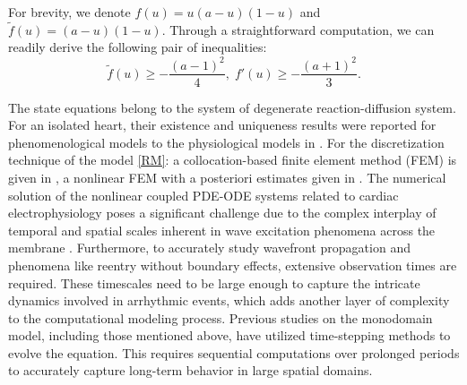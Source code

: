 \documentclass[11pt]{article}
\begin{document}
For brevity, we denote $f(u)= u(a-u)(1-u)$ and $\widetilde{f}(u)= (a-u)(1-u)$. Through a straightforward computation, we can readily derive the following pair of inequalities:
\begin{equation}\label{inequality1}
\widetilde{f}(u)\geq -\frac{(a-1)^2}{4},\;
f'(u)\geq -\frac{(a+1)^2}{3}.
\end{equation}

The state equations belong to the system of degenerate reaction-diffusion system.
For an isolated heart, their existence and uniqueness results were reported for phenomenological models
to the physiological models in \cite{Bourgault08, Nagaiah_COAP11, 
ColliFranzonea02, Veneroni_NARWA09, KW1}. For the discretization technique of the model \eqref{RM}: a collocation-based finite element method (FEM) is given in \cite{rogers1994collocation}, a nonlinear FEM with a posteriori estimates given in \cite{ratti2019posteriori, NK_APNUM10}. 
The numerical solution of the nonlinear coupled PDE-ODE systems related to cardiac electrophysiology poses a significant challenge due to the complex interplay of temporal and spatial scales inherent in wave excitation phenomena across the membrane \cite{Vigmond08:_solvers, Southern_TBE09, ColliFranzone_book14}. Furthermore, to accurately study wavefront propagation and phenomena like reentry without boundary effects, extensive observation times are required. These timescales need to be large enough to capture the intricate dynamics involved in arrhythmic events, which adds another layer of complexity to the computational modeling process. Previous studies on the monodomain model, including those mentioned above, have utilized time-stepping methods to evolve the equation. This requires sequential computations over prolonged periods to accurately capture long-term behavior in large spatial domains. 
\end{document}
